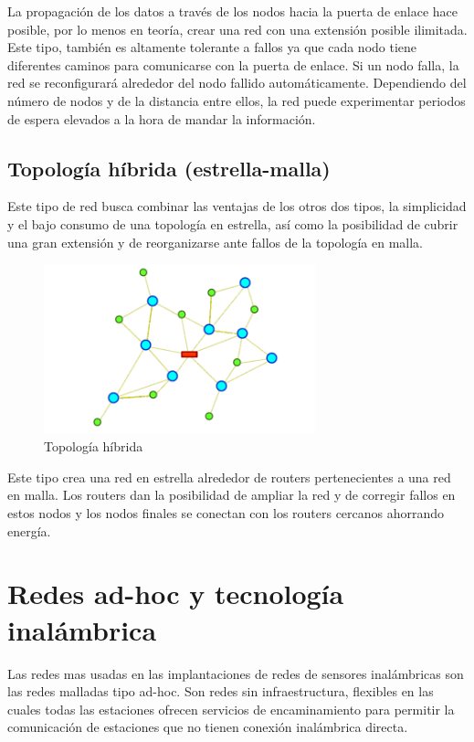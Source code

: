 La propagaci\'on de los datos a trav\'es de los nodos hacia la puerta de enlace hace posible, por lo menos en teor\'ia, crear
una red con una extensi\'on posible ilimitada. Este tipo, tambi\'en es altamente tolerante a fallos ya que cada nodo tiene
diferentes caminos para comunicarse con la puerta de enlace. Si un nodo falla, la red se reconfigurar\'a alrededor del
nodo fallido autom\'aticamente. Dependiendo del n\'umero de nodos y de la distancia entre ellos, la red puede experimentar
periodos de espera elevados a la hora de mandar la informaci\'on. 

\subsection{Topolog\'ia h\'ibrida (estrella-malla)}
Este tipo de red busca combinar las ventajas de los otros dos tipos, la simplicidad y el bajo consumo de una topolog\'ia en estrella, as\'i como la posibilidad de cubrir una gran extensi\'on y de reorganizarse ante fallos de la topolog\'ia en malla.

\begin{figure}[htb]
    \centering
    \includegraphics[width=0.7\textwidth]{imagenes/hibridamalla.png}
    \caption{Topología híbrida}
    \label{fig:top_hibrida}
\end{figure}

 Este tipo crea una red en estrella alrededor de routers pertenecientes a una red en malla. Los routers dan la
posibilidad de ampliar la red y de corregir fallos en estos nodos y los nodos finales se conectan con los routers
cercanos ahorrando energ\'ia.

\section {Redes ad-hoc y tecnolog\'ia inal\'ambrica} 

Las redes mas usadas en las implantaciones de redes de sensores inal\'ambricas son las redes malladas tipo ad-hoc. Son
redes sin infraestructura, flexibles en las cuales todas las estaciones ofrecen servicios de encaminamiento para
permitir la comunicaci\'on de estaciones que no tienen conexi\'on inal\'ambrica directa.

